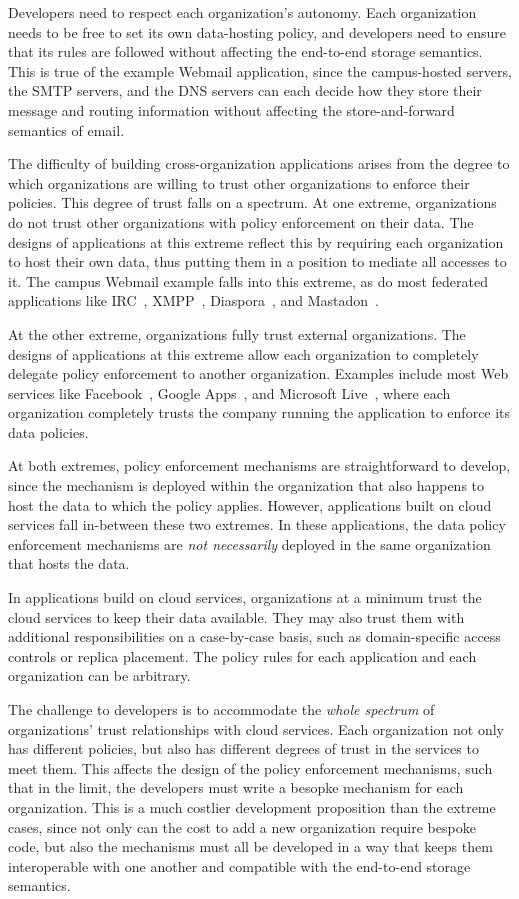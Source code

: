 Developers need to respect each organization's autonomy.
Each organization needs to be free to
set its own data-hosting policy, and developers need to ensure that its
rules are followed without affecting the end-to-end storage semantics.
This is true of the example Webmail application, since the campus-hosted
servers, the SMTP servers, and the DNS servers can each
decide how they store their message and routing information
without affecting the store-and-forward semantics of email.

The difficulty of building cross-organization applications arises from the
degree to which organizations are willing to trust other organizations to enforce
their policies.  This degree of trust falls on a spectrum.
At one extreme, organizations do not trust other organizations with policy
enforcement on their data.  The designs of applications at this extreme reflect this by requiring
each organization to host their own data, thus putting them in a position to
mediate all accesses to it.
The campus Webmail example falls into this extreme, as do most federated
applications like IRC~\cite{irc}, XMPP~\cite{xmpp},
Diaspora~\cite{diaspora}, and Mastadon~\cite{mastadon}.

At the other extreme,
organizations fully trust external organizations.
The designs of applications at this extreme allow each organization to completely delegate
policy enforcement to another organization.  Examples include most Web services like 
Facebook~\cite{facebook}, Google Apps~\cite{gapps}, and Microsoft
Live~\cite{microsoft-live}, where each organization completely trusts the company running
the application to enforce its data policies.

At both extremes, policy enforcement mechanisms are
straightforward to develop, since the mechanism is deployed within the
organization that also happens to host the data to which the policy
applies.  However, applications built on cloud services
fall in-between these two extremes.  In these applications, the data policy
enforcement mechanisms are \emph{not necessarily} deployed in the same
organization that hosts the data.

In applications build on cloud services, organizations
at a minimum trust the cloud services to keep their data available.
They may also trust them with additional
responsibilities on a case-by-case basis,
such as domain-specific access controls or replica placement.
The policy rules for each application and each organization can be arbitrary.

The challenge to developers is to accommodate the \emph{whole spectrum} of
organizations' trust relationships with cloud services.
Each organization not only has different
policies, but also has different degrees of trust in the services to meet them.
This affects the design of the policy enforcement mechanisms, such that
in the limit, the developers must write a besopke mechanism
for each organization.  This is a much costlier development proposition than the extreme
cases, since not only can the cost to add a new organization require bespoke
code, but also the mechanisms must all be developed in a way that keeps them
interoperable with one another and compatible with the end-to-end storage
semantics.


